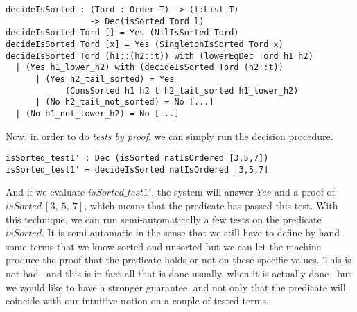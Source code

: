 \begin{lstlisting}
decideIsSorted : (Tord : Order T) -> (l:List T) 
                 -> Dec(isSorted Tord l)
decideIsSorted Tord [] = Yes (NilIsSorted Tord)
decideIsSorted Tord [x] = Yes (SingletonIsSorted Tord x)
decideIsSorted Tord (h1::(h2::t)) with (lowerEqDec Tord h1 h2)
  | (Yes h1_lower_h2) with (decideIsSorted Tord (h2::t))
      | (Yes h2_tail_sorted) = Yes 
      		(ConsSorted h1 h2 t h2_tail_sorted h1_lower_h2) 
      | (No h2_tail_not_sorted) = No [...]
  | (No h1_not_lower_h2) = No [...]
\end{lstlisting}
Now, in order to do \emph{tests by proof}, we can simply run the decision procedure.

\begin{lstlisting}
isSorted_test1' : Dec (isSorted natIsOrdered [3,5,7])
isSorted_test1' = decideIsSorted natIsOrdered [3,5,7] 
\end{lstlisting}
And if we evaluate $isSorted\_test1'$, the system will answer $Yes$ and a proof of $isSorted\ [3,\ 5,\ 7]$, which means that the predicate has passed this test. With this technique, we can run semi-automatically a few tests on the predicate $isSorted$. It is semi-automatic in the sense that we still have to define by hand some terms that we know sorted and unsorted but we can let the machine produce the proof that the predicate holds or not on these specific values. This is not bad --and this is in fact all that is done usually, when it is actually done-- but we would like to have a stronger guarantee, and not only that the predicate will coincide with our intuitive notion on a couple of tested terms.





